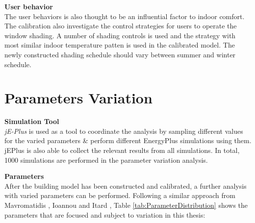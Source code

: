 \documentclass[a4paper, oneside]{discothesis}
\begin{document}
		\textbf{User behavior}\\
			The user behaviors is also thought to be an influential factor to indoor comfort. The calibration also investigate the control strategies for users to operate the window shading. A number of shading controls is used and the strategy with most similar indoor temperature patten is used in the calibrated model. The newly constructed shading schedule should vary between summer and winter schedule.\\


	\section{Parameters Variation}
		
		\textbf{Simulation Tool}\\
		\textit{jE-Plus} is used as a tool to coordinate the analysis by sampling different values for the varied parameters \& perform different EnergyPlus simulations using them. jEPlus is also able to collect the relevant results from all simulations. In total, 1000 simulations are performed in the parameter variation analysis.\\
		
		\par
		\textbf{Parameters}\\
		After the building model has been constructed and calibrated, a further analysis with varied parameters can be performed. Following a similar approach from Mavromatidis \cite{GeorgeThesis}, Ioannou and Itard \cite{ioannou2015energy}, Table \ref{tab:ParameterDistribution} shows the parameters that are focused and subject to variation in this thesis:\\
\end{document}
